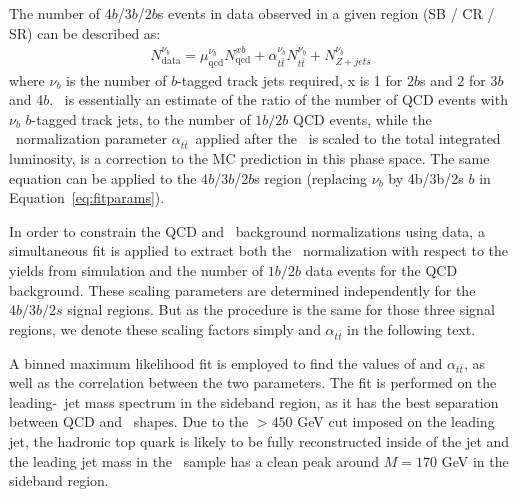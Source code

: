 The number of 4$b$/3$b$/2$b$s events in data observed in a given region (SB / CR / SR) can be described as:
\begin{eqnarray}\label{eq:fitparams}
N^{\nu_b}_{\text{data}} = \mu_{\text{qcd}}^{\nu_b} N^{xb}_{\text{qcd}} + \alpha_{t\bar{t}}^{\nu_b} N^{\nu_b}_{t\bar{t}} + N^{\nu_b}_{Z+jets}
\end{eqnarray}
where $\nu_b$ is the number of $b$-tagged track jets required, x is 1 for 2$b$s and 2 for 3$b$ and 4$b$. \muqcd\ is essentially an estimate of the ratio of the number of  QCD events with $\nu_b$ $b$-tagged track jets, to the number of $1b/2b$ QCD events, while the \ttbar\ normalization parameter $\alpha_{t\bar{t}}$\, applied after the \ttbar\ is scaled to the total integrated luminosity, is a correction to the MC prediction in this phase space. The same equation can be applied to the 4$b$/3$b$/2$b$s region (replacing $\nu_b$ by 4b/3b/2s $b$ in Equation~\ref{eq:fitparams}).   

In order to constrain the QCD and \ttbar\ background normalizations using data, a simultaneous fit is applied to extract both the \ttbar\ normalization with respect to the yields from simulation and the number of $1b/2b$ data events for the QCD background.  These scaling parameters are determined independently for the $4b/3b/2s$ signal regions. But as the procedure is the same for those three signal regions, we denote these scaling factors simply \muqcd and $\alpha_{t\bar{t}}$ in the following text.

A binned maximum likelihood fit is employed to find the values of \muqcd and $\alpha_{t\bar{t}}$, as well as the correlation between the two parameters. The fit is performed on the leading-\pt\ jet mass spectrum in the sideband region, as it has the best separation between QCD and \ttbar\ shapes. Due to the \pt $>450$ GeV cut imposed on the leading \largeR jet, the hadronic top quark is likely to be fully reconstructed inside of the \largeR jet and the leading jet mass in the \ttbar\ sample has a clean peak around $M=170$ GeV in the sideband region.

